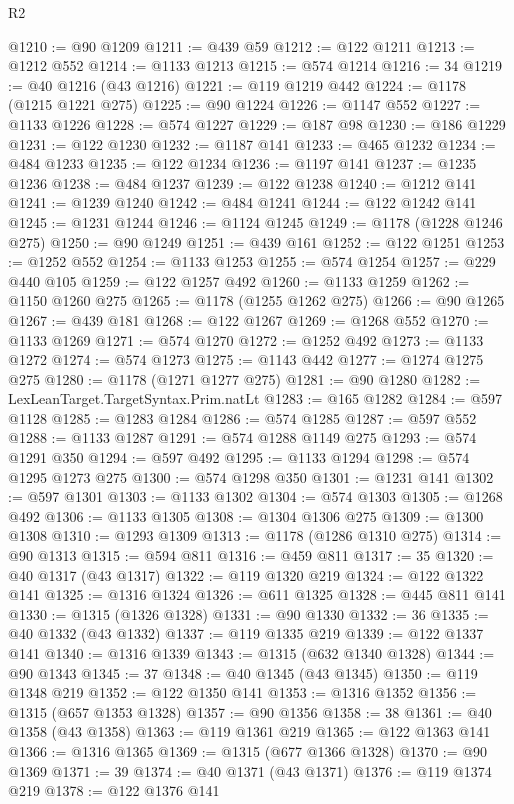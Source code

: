 \begin{lexlean}{R2}
\begin{coremodule}
@1210 := @90 @1209
@1211 := @439 @59
@1212 := @122 @1211
@1213 := @1212 @552
@1214 := @1133 @1213
@1215 := @574 @1214
@1216 := 34
@1219 := @40 @1216 (@43 @1216)
@1221 := @119 @1219 @442
@1224 := @1178 (@1215 @1221 @275)
@1225 := @90 @1224
@1226 := @1147 @552
@1227 := @1133 @1226
@1228 := @574 @1227
@1229 := @187 @98
@1230 := @186 @1229
@1231 := @122 @1230
@1232 := @1187 @141
@1233 := @465 @1232
@1234 := @484 @1233
@1235 := @122 @1234
@1236 := @1197 @141
@1237 := @1235 @1236
@1238 := @484 @1237
@1239 := @122 @1238
@1240 := @1212 @141
@1241 := @1239 @1240
@1242 := @484 @1241
@1244 := @122 @1242 @141
@1245 := @1231 @1244
@1246 := @1124 @1245
@1249 := @1178 (@1228 @1246 @275)
@1250 := @90 @1249
@1251 := @439 @161
@1252 := @122 @1251
@1253 := @1252 @552
@1254 := @1133 @1253
@1255 := @574 @1254
@1257 := @229 @440 @105
@1259 := @122 @1257 @492
@1260 := @1133 @1259
@1262 := @1150 @1260 @275
@1265 := @1178 (@1255 @1262 @275)
@1266 := @90 @1265
@1267 := @439 @181
@1268 := @122 @1267
@1269 := @1268 @552
@1270 := @1133 @1269
@1271 := @574 @1270
@1272 := @1252 @492
@1273 := @1133 @1272
@1274 := @574 @1273
@1275 := @1143 @442
@1277 := @1274 @1275 @275
@1280 := @1178 (@1271 @1277 @275)
@1281 := @90 @1280
@1282 := LexLeanTarget.TargetSyntax.Prim.natLt
@1283 := @165 @1282
@1284 := @597 @1128
@1285 := @1283 @1284
@1286 := @574 @1285
@1287 := @597 @552
@1288 := @1133 @1287
@1291 := @574 @1288 @1149 @275
@1293 := @574 @1291 @350
@1294 := @597 @492
@1295 := @1133 @1294
@1298 := @574 @1295 @1273 @275
@1300 := @574 @1298 @350
@1301 := @1231 @141
@1302 := @597 @1301
@1303 := @1133 @1302
@1304 := @574 @1303
@1305 := @1268 @492
@1306 := @1133 @1305
@1308 := @1304 @1306 @275
@1309 := @1300 @1308
@1310 := @1293 @1309
@1313 := @1178 (@1286 @1310 @275)
@1314 := @90 @1313
@1315 := @594 @811
@1316 := @459 @811
@1317 := 35
@1320 := @40 @1317 (@43 @1317)
@1322 := @119 @1320 @219
@1324 := @122 @1322 @141
@1325 := @1316 @1324
@1326 := @611 @1325
@1328 := @445 @811 @141
@1330 := @1315 (@1326 @1328)
@1331 := @90 @1330
@1332 := 36
@1335 := @40 @1332 (@43 @1332)
@1337 := @119 @1335 @219
@1339 := @122 @1337 @141
@1340 := @1316 @1339
@1343 := @1315 (@632 @1340 @1328)
@1344 := @90 @1343
@1345 := 37
@1348 := @40 @1345 (@43 @1345)
@1350 := @119 @1348 @219
@1352 := @122 @1350 @141
@1353 := @1316 @1352
@1356 := @1315 (@657 @1353 @1328)
@1357 := @90 @1356
@1358 := 38
@1361 := @40 @1358 (@43 @1358)
@1363 := @119 @1361 @219
@1365 := @122 @1363 @141
@1366 := @1316 @1365
@1369 := @1315 (@677 @1366 @1328)
@1370 := @90 @1369
@1371 := 39
@1374 := @40 @1371 (@43 @1371)
@1376 := @119 @1374 @219
@1378 := @122 @1376 @141

\end{coremodule}
\end{lexlean}
